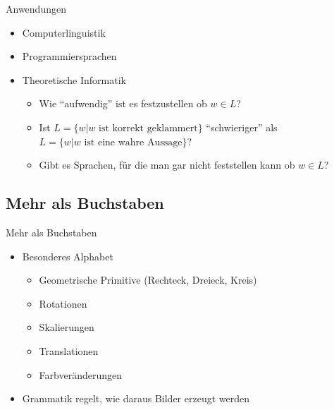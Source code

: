 \documentclass{beamer}
\theoremstyle{example}
\begin{document}
\begin{frame}{Anwendungen}
  \begin{itemize}
  \item Computerlinguistik\pause
  \item Programmiersprachen\pause
  \item Theoretische Informatik\pause
    \begin{itemize}
    \item Wie ``aufwendig'' ist es festzustellen ob $w\in L$?\pause
    \item Ist $L = \{w | \text{$w$ ist korrekt geklammert}\}$ ``schwieriger'' als $L = \{w | \text{$w$ ist eine wahre Aussage}\}$?\pause
    \item Gibt es Sprachen, für die man gar nicht feststellen kann ob $w\in L$?
    \end{itemize}

  \end{itemize}
\end{frame}


\subsection{Mehr als Buchstaben}
\begin{frame}{Mehr als Buchstaben}
  \begin{itemize}
  \item Besonderes Alphabet\pause
    \begin{itemize}
    \item Geometrische Primitive (Rechteck, Dreieck, Kreis)\pause
    \item Rotationen\pause
    \item Skalierungen\pause
    \item Translationen\pause
    \item Farbveränderungen\pause
    \end{itemize}
  \item Grammatik regelt, wie daraus Bilder erzeugt werden
  \end{itemize}
\end{frame}
\end{document}
